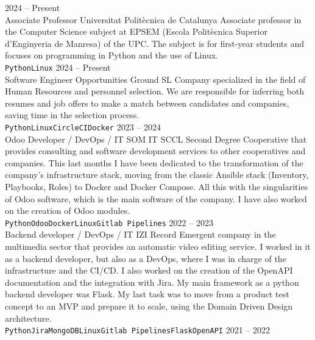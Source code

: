 \documentclass[9pt]{developercv} %
\begin{document}
\begin{entrylist}
	\entry
		{2024 -- Present\\}
		{Associate Professor}
		{Universitat Politècnica de Catalunya}
		{Associate professor in the Computer Science subject at EPSEM (Escola Politècnica Superior d'Enginyeria de Manresa) of the UPC. The subject is for first-year students and focuses on programming in Python and the use of Linux.
		\\ \texttt{Python}\slashsep\texttt{Linux}
		}
	\entry
		{2024 -- Present\\}
		{Software Engineer}
		{Opportunities Ground SL}
		{Company specialized in the field of Human Resources and personnel selection. We are responsible for inferring both resumes and job offers to make a match between candidates and companies, saving time in the selection process.
		\\ \texttt{Python}\slashsep\texttt{Linux}\slashsep\texttt{CircleCI}\slashsep\texttt{Docker}
		}
	\entry
		{2023 -- 2024\\}
		{Odoo Developer / DevOps / IT}
		{SOM IT SCCL}
		{Second Degree Cooperative that provides consulting and software development services to other cooperatives and companies. 
		This last months I have been dedicated to the transformation of the company's infrastructure stack, moving from the classic Ansible stack (Inventory, Playbooks, Roles) to Docker and Docker Compose. All this with the singularities of Odoo software, which is the main software of the company. I have also worked on the creation of Odoo modules.
		\\ \texttt{Python}\slashsep\texttt{Odoo}\slashsep\texttt{Docker}\slashsep\texttt{Linux}\slashsep\texttt{Gitlab Pipelines}
		}
	\entry
		{2022 -- 2023\\}
		{Backend developer / DevOps / IT}
		{IZI Record}
		{Emergent company in the multimedia sector that provides an automatic video editing service.
		I worked in it as a backend developer, but also as a DevOps, where I was in charge of the infrastructure and the CI/CD. I also worked on the creation of the OpenAPI documentation and the integration with Jira. My main framework as a python backend developer was Flask. My last task was to move from a product test concept to an MVP and prepare it to scale, using the Domain Driven Design architecture.
		\\ \texttt{Python}\slashsep\texttt{Jira}\slashsep\texttt{MongoDB}\slashsep\texttt{Linux}\slashsep\texttt{Gitlab Pipelines}\slashsep\texttt{Flask}\slashsep\texttt{OpenAPI}
		}
	\entry
		{2021 -- 2022\\}

\end{entrylist}
\end{document}
